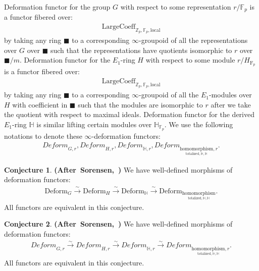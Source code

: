 \documentclass[12pt]{article}
\theoremstyle{definition}
\newtheorem{conjecture}{Conjecture}
\begin{document}
Deformation functor for the group $G$ with respect to some representation $r/\mathbb{F}_p$ is a functor fibered over:
\begin{align}
\mathrm{LargeCoeff}_{\mathbb{Z}_p,\mathbb{F}_p,\mathrm{local}}
\end{align}
by taking any ring $\blacksquare$ to a corresponding $\infty$-groupoid of all the representations over $G$ over $\blacksquare$ such that the representations have quotients isomorphic to $r$ over $\blacksquare/m$. Deformation functor for the $E_1$-ring $H$ with respect to some module $r/H_{\mathrm{F}_p}$ is a functor fibered over:
\begin{align}
\mathrm{LargeCoeff}_{\mathbb{Z}_p,\mathbb{F}_p,\mathrm{local}}
\end{align}
by taking any ring $\blacksquare$ to a corresponding $\infty$-groupoid of all the $E_1$-modules over $H$ with coefficient in $\blacksquare$ such that the modules are isomorphic to $r$ after we take the quotient with respect to maximal ideals. Deformation functor for the derived $E_1$-ring $\mathbb{H}$ is similar lifting certain modules over $\mathbb{H}_{\mathbb{F}_p}$. We use the following notations to denote these $\infty$-deformation functors:
\begin{align}
\textit{Deform}_{G,r}, \textit{Deform}_{H,r}, \textit{Deform}_{\mathbb{H},r}, \textit{Deform}_{\underset{{\mathrm{totalized},\mathbb{H},\mathbb{H}}}{\mathrm{homomorphism}},r}.
\end{align}


\begin{conjecture}\mbox{\textbf{(After Sorensen, \cite[Theorem 1.1]{So1})}}
We have well-defined morphisms of deformation functors:
\begin{align}
\mathrm{Deform}_{G}\overset{\sim}{\rightarrow}\mathrm{Deform}_H\overset{\sim}{\rightarrow} \mathrm{Deform}_\mathbb{H}\overset{\sim}{\rightarrow} \mathrm{Deform}_{\underset{{\mathrm{totalized},\mathbb{H},\mathbb{H}}}{\mathrm{homomorphism}}}.
\end{align}
All functors are equivalent in this conjecture.
\end{conjecture}

\begin{conjecture}\mbox{\textbf{(After Sorensen, \cite[Theorem 1.1]{So1})}}
We have well-defined morphisms of deformation functors:
\begin{align}
\textit{Deform}_{G,r}\overset{\sim}{\rightarrow} \textit{Deform}_{H,r}\overset{\sim}{\rightarrow} \textit{Deform}_{\mathbb{H},r}\overset{\sim}{\rightarrow} \textit{Deform}_{\underset{{\mathrm{totalized},\mathbb{H},\mathbb{H}}}{\mathrm{homomorphism}},r}.
\end{align}
All functors are equivalent in this conjecture.
\end{conjecture}
\end{document}
